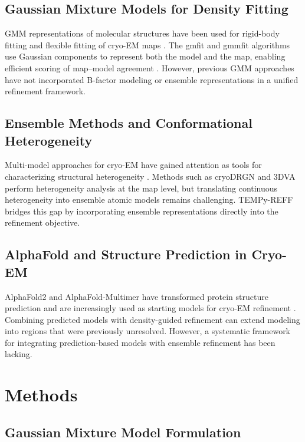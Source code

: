 \documentclass[11pt]{article}
\begin{document}
\subsection{Gaussian Mixture Models for Density Fitting}

GMM representations of molecular structures have been used for rigid-body fitting and flexible fitting of cryo-EM maps \citep{kawabata2008,tama2004}. The gmfit and gmmfit algorithms use Gaussian components to represent both the model and the map, enabling efficient scoring of map--model agreement \citep{kawabata2008}. However, previous GMM approaches have not incorporated B-factor modeling or ensemble representations in a unified refinement framework.

\subsection{Ensemble Methods and Conformational Heterogeneity}

Multi-model approaches for cryo-EM have gained attention as tools for characterizing structural heterogeneity \citep{bonomi2019,zhong2021}. Methods such as cryoDRGN \citep{zhong2021} and 3DVA \citep{punjani2021} perform heterogeneity analysis at the map level, but translating continuous heterogeneity into ensemble atomic models remains challenging. TEMPy-REFF bridges this gap by incorporating ensemble representations directly into the refinement objective.

\subsection{AlphaFold and Structure Prediction in Cryo-EM}

AlphaFold2 \citep{jumper2021} and AlphaFold-Multimer \citep{evans2022} have transformed protein structure prediction and are increasingly used as starting models for cryo-EM refinement \citep{terwilliger2022}. Combining predicted models with density-guided refinement can extend modeling into regions that were previously unresolved. However, a systematic framework for integrating prediction-based models with ensemble refinement has been lacking.

\section{Methods}

\subsection{Gaussian Mixture Model Formulation}
\end{document}
